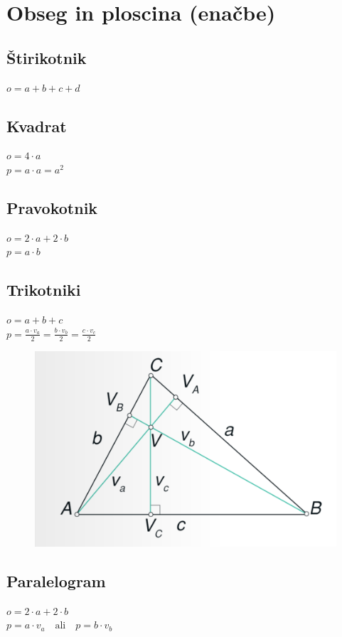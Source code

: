 \documentclass{article}
\begin{document}
\pagestyle{empty}

\section{ Obseg in ploscina (enačbe) }

\subsection{ Štirikotnik }
$ o = a + b + c + d$

\subsection{ Kvadrat }
$ o = 4 \cdot a $ \\
$ p = a \cdot a = a ^ 2$


\subsection{ Pravokotnik }
$ o = 2 \cdot a + 2 \cdot b $ \\
$ p = a \cdot b$

\subsection{ Trikotniki }
$ o = a + b + c $ \\
$ p = \frac{a \cdot v_a}{2} = \frac{b \cdot v_b}{2} = \frac{c \cdot v_c}{2} $

\begin{figure}[h]
    \includegraphics[width=0.4\linewidth]{trikotnik.png}
\end{figure}

\subsection{ Paralelogram }
$ o = 2 \cdot a + 2 \cdot b $ \\
$ p = a \cdot v_a \quad \text{ali} \quad p = b \cdot v_b $
\end{document}

